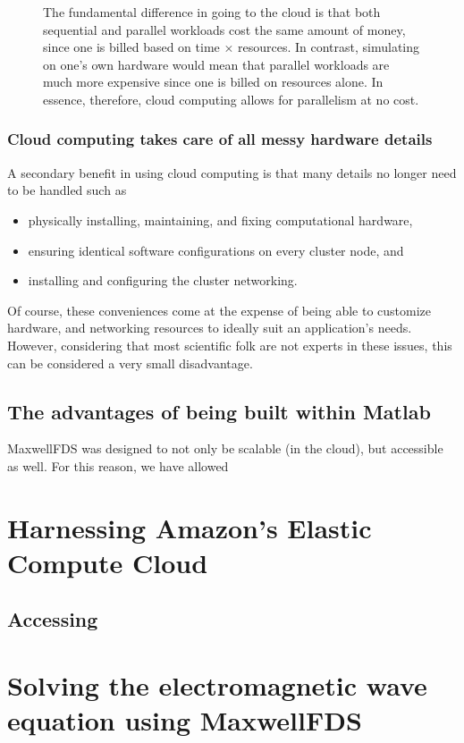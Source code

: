 \documentclass{article}
\newcommand{\MaxwellFDS}{MaxwellFDS }
\newcommand{\BI}{\begin{itemize}\item}
\newcommand{\EI}{\end{itemize}}
\newcommand{\I}{\item}
\begin{document}
\begin{figure}[ht]\begin{center}

\caption{The fundamental difference in going to the cloud
            is that both sequential and parallel workloads
            cost the same amount of money,
            since one is billed based on time $\times$ resources.
        In contrast, simulating on one's own hardware would 
            mean that parallel workloads are much more expensive
            since one is billed on resources alone.
        In essence, therefore, cloud computing allows for 
            parallelism at no cost.}
\label{fig:cloud vs traditional}
\end{center} \end{figure}

\subsubsection{Cloud computing takes care of all messy hardware details}
A secondary benefit in using cloud computing 
    is that many details no longer need to be handled such as
    \BI physically installing, maintaining, and fixing computational hardware,
    \I  ensuring identical software configurations on every cluster node, and 
    \I  installing and configuring the cluster networking. \EI

Of course, these conveniences come at the expense of 
    being able to customize hardware, and networking resources
    to ideally suit an application's needs.
However, considering that most scientific folk
    are not experts in these issues,
    this can be considered a very small disadvantage.

\subsection{The advantages of being built within Matlab}
\MaxwellFDS was designed to not only be scalable (in the cloud),
    but accessible as well.
For this reason, we have allowed
    

\section{Harnessing Amazon's Elastic Compute Cloud} 
\subsection{Accessing }

\section{Solving the electromagnetic wave equation using \MaxwellFDS}
\end{document}
